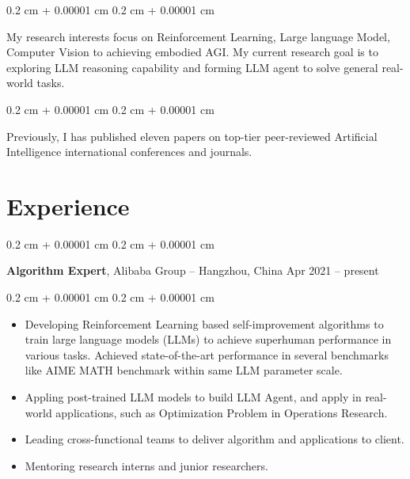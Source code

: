 \documentclass[10pt, letterpaper]{article}
\newenvironment{highlights}{
    \begin{itemize}[
        topsep=0.10 cm,
        parsep=0.10 cm,
        partopsep=0pt,
        itemsep=0pt,
        leftmargin=0.4 cm + 10pt
    ]
}{
    \end{itemize}
} %
\newenvironment{onecolentry}{
    \begin{adjustwidth}{
        0.2 cm + 0.00001 cm
    }{
        0.2 cm + 0.00001 cm
    }
}{
    \end{adjustwidth}
} %
\newenvironment{twocolentry}[2][]{
    \onecolentry
    \def\secondColumn{#2}
    \setcolumnwidth{\fill, 4.5 cm}
    \begin{paracol}{2}
}{
    \switchcolumn \raggedleft \secondColumn
    \end{paracol}
    \endonecolentry
} %
\begin{document}
        \begin{onecolentry}
            My research interests focus on Reinforcement Learning, Large language Model, Computer Vision to achieving embodied AGI. My current research goal is to exploring LLM reasoning capability and forming LLM agent to solve general real-world tasks.
        \end{onecolentry}

        \vspace{0.2 cm}

        \begin{onecolentry}
            Previously, I has published eleven papers on top-tier peer-reviewed Artificial Intelligence international conferences and journals.
        \end{onecolentry}


    
    \section{Experience}



        
        \begin{twocolentry}{
            Apr 2021 – present
        }
            \textbf{Algorithm Expert}, Alibaba Group -- Hangzhou, China\end{twocolentry}

        \vspace{0.10 cm}
        \begin{onecolentry}
            \begin{highlights}
                \item Developing Reinforcement Learning based self-improvement algorithms to train large language models (LLMs) to achieve superhuman performance in various tasks. Achieved state-of-the-art performance in several benchmarks like AIME MATH benchmark within same LLM parameter scale.
                \item Appling post-trained LLM models to build LLM Agent, and apply in real-world applications, such as Optimization Problem in Operations Research.
                \item Leading cross-functional teams to deliver algorithm and applications to client.
                \item Mentoring research interns and junior researchers.
            \end{highlights}
        \end{onecolentry}
\end{document}
